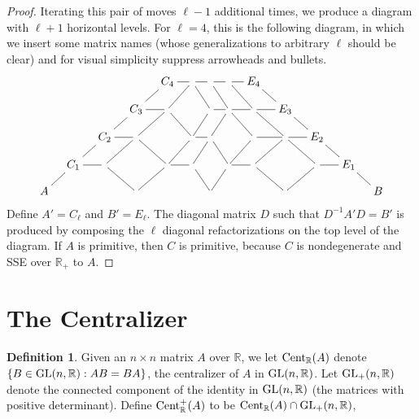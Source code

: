 \documentclass{amsart}
\theoremstyle{definition}
\newtheorem{definition}[theorem]{Definition}
\theoremstyle{remark}
\newcommand{\za}{\textnormal{Cent}_{\mathbb R}(A)}
\newcommand{\zaa}{\textnormal{Cent}^+_{\mathbb R}(A)}
\numberwithin{equation}{section}
\begin{document}
{{\begin{proof}
Iterating this pair of moves  $\ell -1$ additional times, 
we produce a diagram with $\ell +1$ horizontal levels.  
 For $\ell =4$, this is the following diagram, in which
 we insert some matrix 
names (whose generalizations to arbitrary $\ell$
should be clear) and 
for visual 
simplicity  suppress arrowheads and bullets.  
\begin{equation}
\xymatrix@=10pt{
&&&& C_4\ar@{-}[dl]\ar@{-}[r] & \ar@{-}[dl]\ar@{-}[dr] \ar@{-}[r]  &\ar@{-}[r]\ar@{-}[dr]   &  \ar@{-}[dr]\ar@{-}[r]  &  
E_4\ar@{-}[dr] &&  &  &  \\
&&&  C_3\ar@{-}[dl]\ar@{-}[r] & \ar@{-}[dl]\ar@{-}[dr] & & \ar@{-}[dl]\ar@{-}[r]  &\ar@{-}[dl]\ar@{-}[dr] \ar@{-}[r]       &  \ar@{-}[dr]\ar@{-}[r] &
E_3\ar@{-}[dr] &&      \\
&&  C_2\ar@{-}[dl]\ar@{-}[r] & \ar@{-}[dl]\ar@{-}[dr] & & \ar@{-}[dl]\ar@{-}[r]  &\ar@{-}[dl]\ar@{-}[dr]     &  &  \ar@{-}[dl]\ar@{-}[r] 
 &\ar@{-}[dl]\ar@{-}[dr] \ar@{-}[r]    &E_2\ar@{-}[dr]  &  &      \\
    & C_1 \ar@{-}[r]\ar@{-}[dl] &  \ar@{-}[dr] &    &  \ar@{-}[r]\ar@{-}[dl] &  \ar@{-}[dr] &    &  \ar@{-}[r]\ar@{-}[dl] &  \ar@{-}[dr] & 
  &  \ar@{-}[r]\ar@{-}[dl] & E_1 \ar@{-}[dr] &      \\
A &                 &           & &                 &           &  &                 &       
   & &                 &           & B                                         
}
\end{equation}
Define $A'=C_{\ell}$ and $B'=E_{\ell}$.
The diagonal matrix $D$ such that $D^{-1}A'D=B'$ is produced by composing 
the $\ell$ diagonal refactorizations on the top level of the diagram. 
 If $A$ is primitive, then $C$ is primitive, because $C$ is nondegenerate 
and SSE over $\mathbb R_+$ to $A$. 
\end{proof} 




\section{The Centralizer} \label{centralizersec}
        
\begin{definition} Given 
an $n\times n$ matrix $A$ over $\mathbb R$,  we let 
$\za$ denote $\{B\in \textnormal{GL}(n,\mathbb R): AB=BA\}$, the centralizer 
of $A$ in $\textnormal{GL}(n,\mathbb R)$. 
 Let $\textnormal{GL}_+(n, \mathbb R)$ denote the connected component of the 
identity in $\textnormal{GL}(n, \mathbb R)$ (the matrices with positive determinant). 
Define
$\zaa $ to be $\za \cap \textnormal{GL}_+(n, \mathbb R)$,
\end{definition} 

}}
\end{document}
